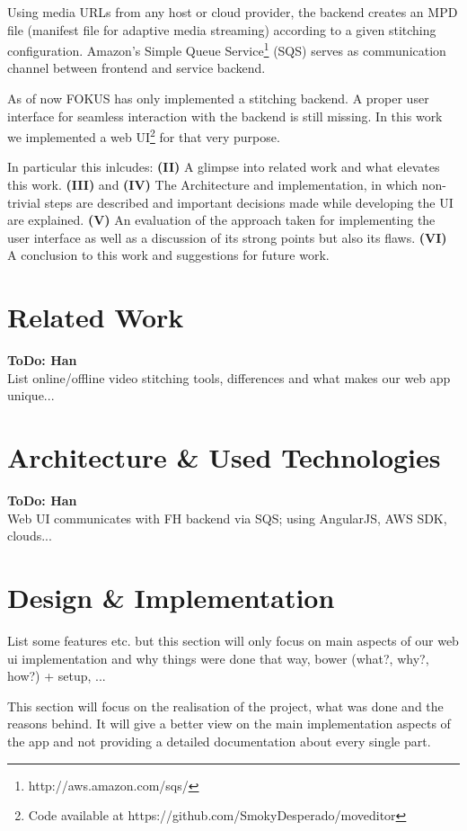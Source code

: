 \documentclass[conference]{IEEEtran}
\begin{document}
Using media URLs from any host or cloud provider, the backend creates an MPD file (manifest file for adaptive media streaming\cite{Sodagar}) according to a given stitching configuration.
Amazon's Simple Queue Service\footnote{http://aws.amazon.com/sqs/} (SQS) serves as communication channel between frontend and service backend.

As of now FOKUS has only implemented a stitching backend. A proper user interface for seamless interaction with the backend is still missing.
In this work we implemented a web UI\footnote{Code available at https://github.com/SmokyDesperado/moveditor} for that very purpose.

In particular this inlcudes:
\textbf{(II)} A glimpse into related work and what elevates this work.
\textbf{(III)} and \textbf{(IV)} The Architecture and implementation, in which non-trivial steps are described and important decisions made while developing the UI are explained.
\textbf{(V)} An evaluation of the approach taken for implementing the user interface as well as a discussion of its strong points but also its flaws.
\textbf{(VI)} A conclusion to this work and suggestions for future work.

\section{Related Work}
\textbf{ToDo: Han} \\
List online/offline video stitching tools, differences and what makes our web app unique...

\section{Architecture \& Used Technologies}
\textbf{ToDo: Han} \\
Web UI communicates with FH backend via SQS; using AngularJS, AWS SDK, clouds...

\section{Design \& Implementation}
List some features etc. but this section will only focus on main aspects of our web ui implementation and why things were done that way, bower (what?, why?, how?) + setup, ...

This section will focus on the realisation of the project, what was done and the reasons behind. It will give a better view on the main implementation aspects of the app and not providing a detailed documentation about every single part.
\end{document}
